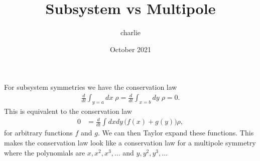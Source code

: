 \documentclass[12pt]{article}
\title{Subsystem vs Multipole}
\author{charlie}
\date{October 2021}
\begin{document}
\maketitle

For subsystem symmetries we have the conservation law
\begin{align}
\frac{d}{dt} \int_{y=a} dx \; \rho = \frac{d}{dt} \int_{x=b} dy \; \rho = 0.
\end{align}
This is equivalent to the conservation law
\begin{align}
0 &= \frac{d}{dt} \int dxdy \, \big ( f(x) + g(y) \big )\rho,
\end{align}
for arbitrary functions $f$ and $g$. We can then Taylor expand these functions. This makes the conservation law look like a conservation law for a multipole symmetry where the polynomials are $x, x^2, x^3, \dots$ and $y, y^2, y^3, \dots$
\end{document}
